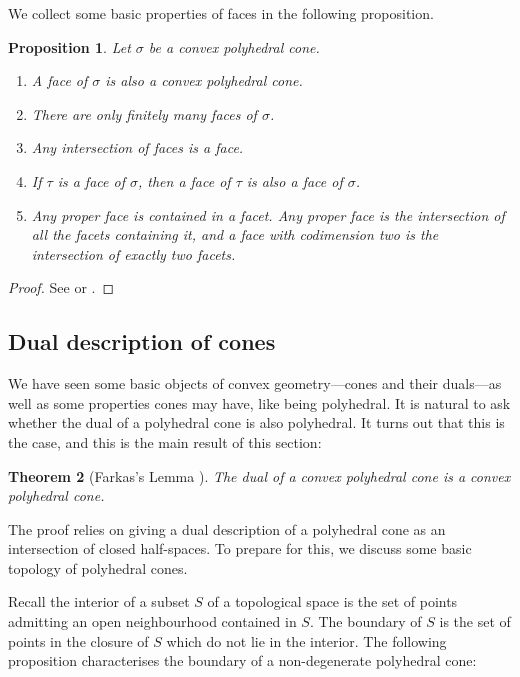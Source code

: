 \documentclass[12pt]{amsart}
\theoremstyle{plain}
\newtheorem{theorem}{Theorem}[subsection]
\newtheorem{proposition}[theorem]{Proposition}
\theoremstyle{definition}
\begin{document}
We collect some basic properties of faces in the following proposition.

\begin{proposition}
Let $\sigma$ be a convex polyhedral cone.
\begin{enumerate}
\item A face of $\sigma$ is also a convex polyhedral cone.
\item There are only finitely many faces of $\sigma$.
\item Any intersection of faces is a face.
\item If $\tau$ is a face of $\sigma$, then a face of $\tau$ is also a face of $\sigma$.
\item Any proper face is contained in a facet.
Any proper face is the intersection of all the facets containing it, and a face with codimension two is the intersection of exactly two facets.
\end{enumerate}
\end{proposition}
\begin{proof}
See \cite[\S 1.2]{Fulton93} or \cite[\S 1]{Zaman13}.
\end{proof}





\subsection{Dual description of cones}\label{section:dualdescription}
We have seen some basic objects of convex geometry---cones and their duals---as well as some properties cones may have, like being polyhedral.
It is natural to ask whether the dual of a polyhedral cone is also polyhedral.
It turns out that this is the case, and this is the main result of this section:

\begin{theorem}[{Farkas's Lemma \cite[\S 1.2]{Fulton93}}]\label{theorem:farkas}
The dual of a convex polyhedral cone is a convex polyhedral cone.
\end{theorem}

The proof relies on giving a dual description of a polyhedral cone as an intersection of closed half-spaces.
To prepare for this, we discuss some basic topology of polyhedral cones.

Recall the interior of a subset $S$ of a topological space is the set of points admitting an open neighbourhood contained in $S$.
The boundary of $S$ is the set of points in the closure of $S$ which do not lie in the interior.
The following proposition characterises the boundary of a non-degenerate polyhedral cone:
\end{document}
